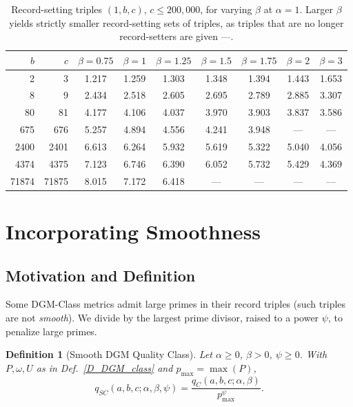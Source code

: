 \documentclass[11pt,letterpaper]{amsart}
\newtheorem{definition}[theorem]{Definition}
\begin{document}
\begin{table}[t]
\centering\small
\begin{tabular}{|r|r|c|c|c|c|c|c|c|}
\hline
$b$ & $c$ & $\beta=0.75$ & $\beta=1$ & $\beta=1.25$ & $\beta=1.5$ & $\beta=1.75$ & $\beta=2$ & $\beta=3$ \\
\hline
2     & 3     & 1.217 & 1.259 & 1.303 & 1.348 & 1.394 & 1.443 & 1.653 \\
8     & 9     & 2.434 & 2.518 & 2.605 & 2.695 & 2.789 & 2.885 & 3.307 \\
80    & 81    & 4.177 & 4.106 & 4.037 & 3.970 & 3.903 & 3.837 & 3.586 \\
675   & 676   & 5.257 & 4.894 & 4.556 & 4.241 & 3.948 & ---   & ---   \\
2400  & 2401  & 6.613 & 6.264 & 5.932 & 5.619 & 5.322 & 5.040 & 4.056 \\
4374  & 4375  & 7.123 & 6.746 & 6.390 & 6.052 & 5.732 & 5.429 & 4.369 \\
71874 & 71875 & 8.015 & 7.172 & 6.418 & ---   & ---   & ---   & ---   \\
\hline
\end{tabular}
\caption{Record-setting triples $(1,b,c)$, $c\le 200{,}000$, for varying $\beta$ at $\alpha=1$. Larger $\beta$ yields strictly smaller record-setting sets of triples, as triples that are no longer record-setters are given ---.}
\label{Class_8_short}
\end{table}
\iffalse
\section{Incorporating Smoothness}
\label{S_Smoothness}

\subsection{Motivation and Definition}

Some DGM-Class metrics admit large primes in their record triples (such triples are not \emph{smooth}). We divide by the largest prime divisor, raised to a power $\psi$, to penalize large primes.

\begin{definition}[Smooth DGM Quality Class]\label{D_Smooth_Class}
Let $\alpha\ge 0$, $\beta>0$, $\psi\ge 0$. With $P,\omega,U$ as in Def.\ \ref{D_DGM_class} and $p_{\max}=\max(P)$,
\[
q_{SC}(a,b,c;\alpha,\beta,\psi) = \frac{q_C(a,b,c;\alpha,\beta)}{p_{\max}^\psi}.
\]
\end{definition}
\end{document}
